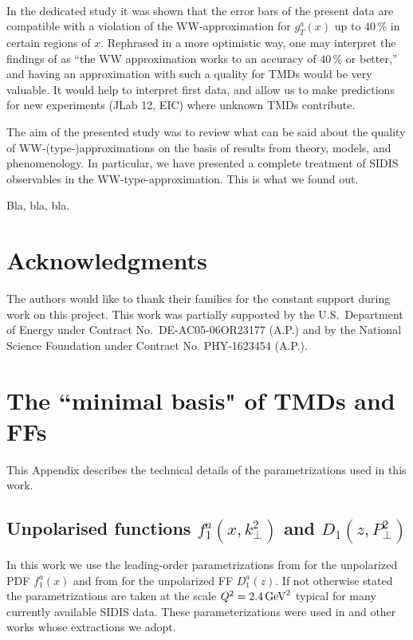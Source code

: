 \documentclass[a4paper,11pt]{article}
\begin{document}
\

In the dedicated study \cite{Accardi:2009au} it was shown that the
error bars of the present data are compatible with a violation of the 
WW-approximation for $g_T^a(x)$ up to $40\,\%$ in certain regions of $x$. 
Rephrased in a more optimistic way, one may interpret the findings of
\cite{Accardi:2009au} as ``the WW approximation works to an accuracy of
 $40\,\%$ or better,'' and having an approximation with such a quality
for TMDs would be very valuable. It would help to interpret first
data, and allow us to make predictions for new experiments 
(JLab 12, EIC) where unknown TMDs contribute.

The aim of the presented study was to review what can be said about
the quality of  WW-(type-)approximations on the basis of results
from theory, models, and phenomenology. In particular, we have
presented a complete treatment of SIDIS observables in the
WW-type-approximation. This is what we found out.

Bla, bla, bla.



\section{Acknowledgments}
The authors would like to thank their families for the constant support during work on this project. This work was partially supported by the U.S.\
Department of Energy under Contract No.~DE-AC05-06OR23177 (A.P.) and by the National Science Foundation under Contract No. PHY-1623454 (A.P.).


 
\newpage
\appendix

\section{\boldmath The ``minimal basis" of TMDs and FFs}
\label{App:basis}

This Appendix describes the technical details of the parametrizations
used in this work.

\subsection{\boldmath Unpolarised functions $f_1^a(x,k_\perp^2)$ 
			and $D_1(z,P_\perp^2)$}
\label{App:basis-f1-D1}

In this work we use the leading-order parametrizations 
from \cite{Martin:2009iq} for the unpolarized PDF $f_1^a(x)$ and 
from \cite{deFlorian:2007aj} for the unpolarized FF $D_1^a(z)$.
If not otherwise stated the parametrizations are taken at the scale 
$Q^2=2.4\,{\rm GeV}^2$ typical for many currently available SIDIS data.
These parameterizations were used in \cite{Anselmino:2005nn} and other 
works whose extractions we adopt. 
\end{document}
